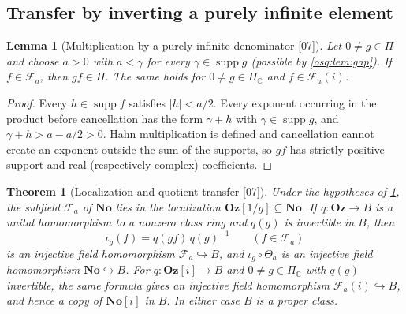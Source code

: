 \documentclass[11pt,letterpaper]{article}
\numberwithin{equation}{section}
\newtheorem{theorem}{Theorem}[section]
\newtheorem{lemma}[lemma]{Lemma}
\theoremstyle{definition}
\theoremstyle{remark}
\theoremstyle{plain}
\newcommand{\No}{\mathbf{No}}
\newcommand{\Oz}{\mathbf{Oz}}
\newcommand{\SC}{\No[i]}
\newcommand{\GOz}{\Oz[i]}
\newcommand{\C}{\mathbb C}
\newcommand{\FF}{\mathscr F}         %
\newcommand{\supp}{\operatorname{supp}}
\newcommand{\src}[1]{\textup{\textsf{[#1]}}}
\begin{document}
\subsection{Transfer by inverting a purely infinite element}\label{osq:if:sub:transfer}

\begin{lemma}[Multiplication by a purely infinite denominator \src{07}]\label{osq:if:lem:gf}
Let $0\ne g\in\Pi$ and choose $a>0$ with $a<\gamma$ for every $\gamma\in\supp g$ (possible
by \cref{osq:lem:gap}). If $f\in\FF_a$, then $gf\in\Pi$. The same holds for
$0\ne g\in\Pi_\C$ and $f\in\FF_a(i)$.
\end{lemma}

\begin{proof}
Every $h\in\supp f$ satisfies $|h|<a/2$. Every exponent occurring in the product before
cancellation has the form $\gamma+h$ with $\gamma\in\supp g$, and
$\gamma+h>a-a/2>0$. Hahn multiplication is defined and cancellation cannot create an
exponent outside the sum of the supports, so $gf$ has strictly positive support and real
(respectively complex) coefficients.
\end{proof}

\begin{theorem}[Localization and quotient transfer \src{07}]\label{osq:if:thm:transfer}
Under the hypotheses of \cref{osq:if:lem:gf}, the subfield $\FF_a$ of $\No$ lies in the
localization $\Oz[1/g]\subseteq\No$. If $q:\Oz\to B$ is a unital homomorphism to a nonzero
class ring and $q(g)$ is invertible in $B$, then
\begin{equation}\label{osq:if:eq:transfer}
 \iota_g(f)=q(gf)\,q(g)^{-1}\qquad(f\in\FF_a)
\end{equation}
is an injective field homomorphism $\FF_a\hookrightarrow B$, and $\iota_g\circ\Theta_a$ is
an injective field homomorphism $\No\hookrightarrow B$. For $q:\GOz\to B$ and
$0\ne g\in\Pi_\C$ with $q(g)$ invertible, the same formula gives an injective field
homomorphism $\FF_a(i)\hookrightarrow B$, and hence a copy of $\SC$ in $B$. In either case
$B$ is a proper class.
\end{theorem}
\end{document}
